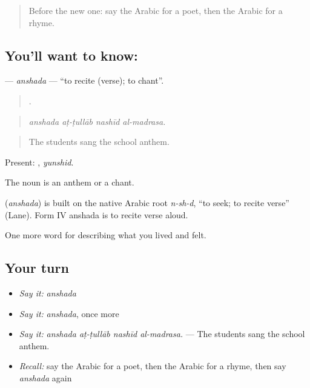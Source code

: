 \label{lesson:AR-C545-anshada}



\begin{quote}
Before the new one: say the Arabic for a poet, then the Arabic for a rhyme.
\end{quote}

\subsection*{You'll want to know: }
\textbf{} — \emph{anshada} — \textquotedblleft{}to recite (verse); to chant\textquotedblright{}.

\begin{quote}
   .
\end{quote}

\begin{quote}
\emph{anshada aṭ-ṭullāb nashīd al-madrasa.}
\end{quote}

\begin{quote}
The students sang the school anthem.
\end{quote}

Present: , \emph{yunshid}.

The noun  is an anthem or a chant.

\begin{cousinweb}
\textbf{} (\emph{anshada}) is built on the native Arabic root \emph{n-sh-d}, \textquotedblleft{}to seek; to recite verse\textquotedblright{} (Lane). Form IV anshada is to recite verse aloud.
\end{cousinweb}

\begin{grammarlens}[title={What you've built}]
One more word for describing what you lived and felt.
\end{grammarlens}

\subsection*{Your turn}
\begin{itemize}
\raggedright
  \item \emph{Say it:} \emph{anshada}
  \item \emph{Say it:} \emph{anshada}, once more
  \item \emph{Say it:} \emph{anshada aṭ-ṭullāb nashīd al-madrasa.} — The students sang the school anthem.
  \item \emph{Recall:} say the Arabic for a poet, then the Arabic for a rhyme, then say \emph{anshada} again
\end{itemize}

